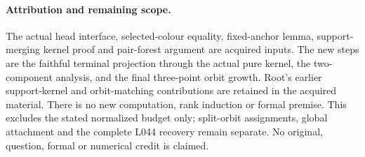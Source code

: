 \documentclass[11pt,a4paper]{article}
\begin{document}
\paragraph{Attribution and remaining scope.}
The actual head interface, selected-colour equality,
fixed-anchor lemma, support-merging kernel proof and
pair-forest argument are acquired inputs. The new
steps are the faithful terminal projection through
the actual pure kernel, the two-component analysis,
and the final three-point orbit growth. Root's earlier
support-kernel and orbit-matching contributions are
retained in the acquired material. There is no new
computation, rank induction or formal premise.
This excludes the stated normalized budget only;
split-orbit assignments, global attachment and the
complete L044 recovery remain separate. No original,
question, formal or numerical credit is claimed.
\end{document}
